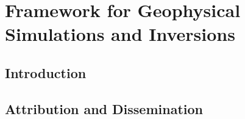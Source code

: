 
\chapter{Framework for Geophysical Simulations and Inversions}
\label{ch:simpeg}

\section{Introduction}
\section{Attribution and Dissemination}
